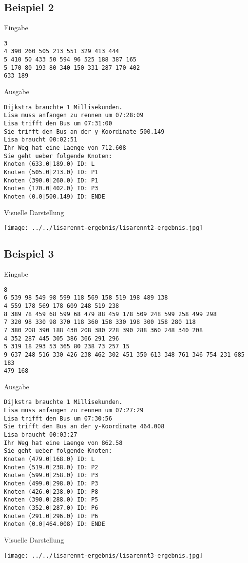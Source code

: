 \documentclass[a4paper,10pt,ngerman]{scrartcl}
\begin{document}
\subsection{Beispiel 2}
Eingabe
\begin{lstlisting}
3
4 390 260 505 213 551 329 413 444
5 410 50 433 50 594 96 525 188 387 165
5 170 80 193 80 340 150 331 287 170 402
633 189
\end{lstlisting}
Ausgabe
\begin{lstlisting}
Dijkstra brauchte 1 Millisekunden.
Lisa muss anfangen zu rennen um 07:28:09
Lisa trifft den Bus um 07:31:00
Sie trifft den Bus an der y-Koordinate 500.149
Lisa braucht 00:02:51
Ihr Weg hat eine Laenge von 712.608
Sie geht ueber folgende Knoten:
Knoten (633.0|189.0) ID: L
Knoten (505.0|213.0) ID: P1
Knoten (390.0|260.0) ID: P1
Knoten (170.0|402.0) ID: P3
Knoten (0.0|500.149) ID: ENDE
\end{lstlisting}
Visuelle Darstellung
\begin{center}
\texttt{[image: ../../lisarennt-ergebnis/lisarennt2-ergebnis.jpg]} 
\end{center}
\subsection{Beispiel 3}
Eingabe
\begin{lstlisting}
8
6 539 98 549 98 599 118 569 158 519 198 489 138
4 559 178 569 178 609 248 519 238
8 389 78 459 68 599 68 479 88 459 178 509 248 599 258 499 298
7 320 98 330 98 370 118 360 158 330 198 300 158 280 118
7 380 208 390 188 430 208 380 228 390 288 360 248 340 208
4 352 287 445 305 386 366 291 296
5 319 18 293 53 365 80 238 73 257 15
9 637 248 516 330 426 238 462 302 451 350 613 348 761 346 754 231 685 183
479 168
\end{lstlisting}
Ausgabe
\begin{lstlisting}
Dijkstra brauchte 1 Millisekunden.
Lisa muss anfangen zu rennen um 07:27:29
Lisa trifft den Bus um 07:30:56
Sie trifft den Bus an der y-Koordinate 464.008
Lisa braucht 00:03:27
Ihr Weg hat eine Laenge von 862.58
Sie geht ueber folgende Knoten:
Knoten (479.0|168.0) ID: L
Knoten (519.0|238.0) ID: P2
Knoten (599.0|258.0) ID: P3
Knoten (499.0|298.0) ID: P3
Knoten (426.0|238.0) ID: P8
Knoten (390.0|288.0) ID: P5
Knoten (352.0|287.0) ID: P6
Knoten (291.0|296.0) ID: P6
Knoten (0.0|464.008) ID: ENDE
\end{lstlisting}
Visuelle Darstellung
\begin{center}
\texttt{[image: ../../lisarennt-ergebnis/lisarennt3-ergebnis.jpg]} 
\end{center}
\end{document}

